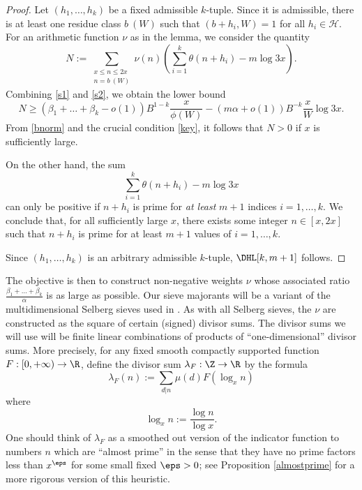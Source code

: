 \begin{proof}
Let $(h_1,\ldots,h_{k})$ be a fixed
  admissible $k$-tuple.  Since it is admissible, there is at least
  one residue class $b\ (W)$ such that $(b+h_i,W)=1$ for all $h_i
  \in {\mathcal H}$.  For an arithmetic function $\nu$ as in the
  lemma, we consider the quantity
$$
N:=\sum_{\substack{x \leq n \leq 2x\\ n = b\ (W)}}
 \nu(n) \left(\sum_{i=1}^{k} \theta(n+h_i) - m\log 3x\right).
$$
Combining \eqref{s1} and \eqref{s2}, we obtain the lower bound
$$ 
N\geq (\beta_1+\dots+\beta_k-o(1)) B^{1-k} \frac{x}{\phi(W)} - (m\alpha+o(1)) B^{-k} \frac{x}{W} \log 3x.
$$ 
From \eqref{bnorm} and the crucial condition \eqref{key}, it follows that
$N>0$ if $x$ is sufficiently large.
\par
On the other hand, the sum
$$
\sum_{i=1}^{k} \theta(n+h_i) - m\log 3x
$$ 
can only be positive if $n+h_i$ is prime for \emph{at least} $m+1$
indices $i=1, \ldots, k$.  We conclude that, for all sufficiently
large $x$, there exists some integer $n \in [x,2x]$ such that $n+h_i$
is prime for at least $m+1$ values of $i=1,\ldots,k$. 
\par
Since $(h_1,\dots,h_k)$ is an arbitrary admissible $k$-tuple,
$\DHL[k,m+1]$ follows.
\end{proof}

The objective is then to construct non-negative weights $\nu$ whose associated ratio $\frac{\beta_1+\dots+\beta_k}{\alpha}$ is as large as possible.   Our sieve majorants will be a variant of the multidimensional Selberg sieves used in \cite{maynard-new}.  As with all Selberg sieves, the $\nu$ are constructed as the square of certain (signed) divisor sums.  The divisor sums we will use will be finite linear combinations of products of ``one-dimensional'' divisor sums.  More precisely, for any fixed smooth compactly supported function $F: [0,+\infty) \to \R$, define the divisor sum $\lambda_F: \Z \to \R$ by the formula
\begin{equation}\label{lambdaf-def}
\lambda_F(n) := \sum_{d|n} \mu(d) F( \log_x n )
\end{equation}
where
\begin{equation}\label{logx-def}
\log_x n:= \frac{\log n}{\log x}.
\end{equation}
One should think of $\lambda_F$ as a smoothed out version of the indicator function to numbers $n$ which are ``almost prime'' in the sense that they have no prime factors less than $x^\eps$ for some small fixed $\eps>0$; see Proposition \ref{almostprime} for a more rigorous version of this heuristic.

